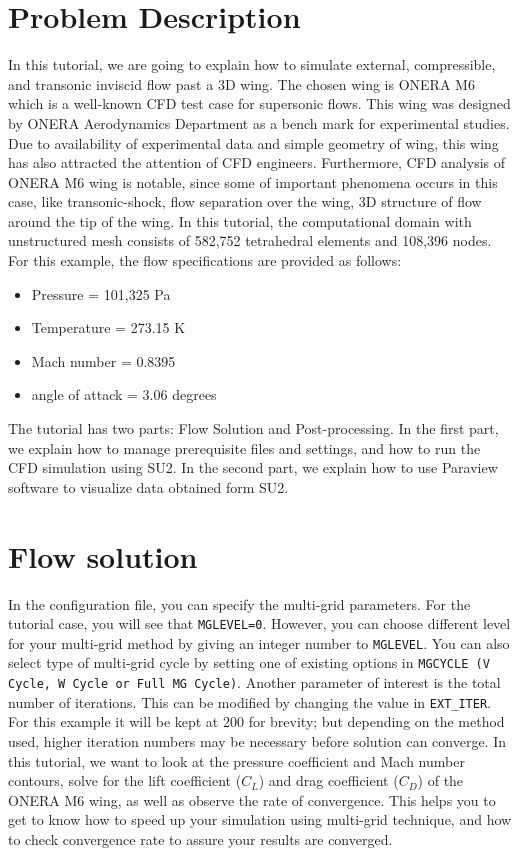 \section{Problem Description}
In this tutorial, we are going to explain how to simulate external, compressible, and transonic inviscid flow past a 3D wing. The chosen wing is ONERA M6 which is a well-known CFD test case for supersonic flows. This wing was designed by ONERA Aerodynamics Department as a bench mark for experimental studies. Due to availability of experimental data and simple geometry of wing, this wing has also attracted the attention of CFD engineers. Furthermore, CFD analysis of ONERA M6 wing is notable, since some of important phenomena occurs in this case, like transonic-shock, flow separation over the wing, 3D structure of flow around the tip of the wing. In this tutorial, the computational domain with unstructured mesh consists of 582,752 tetrahedral elements and 108,396 nodes. For this example, the flow specifications are provided as follows:
\begin{itemize}
    \item Pressure = 101,325 Pa
    \item Temperature = 273.15 K
    \item Mach number = 0.8395
    \item angle of attack = 3.06 degrees
\end{itemize}

The tutorial has two parts: Flow Solution and Post-processing. In the first part, we explain how to manage prerequisite files and settings, and how to run the CFD simulation using SU2. In the second part, we explain how to use Paraview software to visualize data obtained form SU2.
\section{Flow solution}
In the configuration file, you can specify the multi-grid parameters. For the tutorial case, you will see that \texttt{MGLEVEL=0}. However, you can choose different level for your multi-grid method by giving an integer number to \texttt{MGLEVEL}. You can also select type of multi-grid cycle by setting one of existing options in \texttt{MGCYCLE (V Cycle, W Cycle or Full MG Cycle)}. Another parameter of interest is the total number of iterations. This can be modified by changing the value in \texttt{EXT\_ITER}. For this example it will be kept at 200 for brevity; but depending on the method used, higher iteration numbers may be necessary before solution can converge. In this tutorial, we want to look at the pressure coefficient and Mach number contours, solve for the lift coefficient ($C_L$) and drag coefficient ($C_D$) of the ONERA M6 wing, as well as observe the rate of convergence. This helps you to get to know how to speed up your simulation using multi-grid technique, and how to check convergence rate to assure your results are converged.


